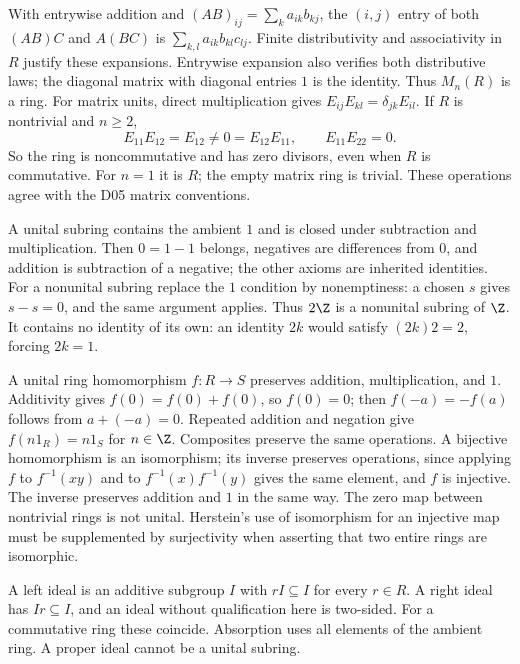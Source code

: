 With entrywise addition and $(AB)_{ij}=\sum_k a_{ik}b_{kj}$, the
$(i,j)$ entry of both $(AB)C$ and $A(BC)$ is
$\sum_{k,l}a_{ik}b_{kl}c_{lj}$. Finite distributivity and associativity
in $R$ justify these expansions. Entrywise expansion also verifies both
distributive laws; the diagonal matrix with diagonal entries $1$ is the
identity. Thus $M_n(R)$ is a ring.
For matrix units, direct multiplication gives
$E_{ij}E_{kl}=\delta_{jk}E_{il}$. If $R$ is nontrivial and $n\ge2$,
\[
 E_{11}E_{12}=E_{12}\ne0=E_{12}E_{11},\qquad E_{11}E_{22}=0.
\]
So the ring is noncommutative and has zero divisors, even when $R$ is
commutative. For $n=1$ it is $R$; the empty matrix ring is trivial.
These operations agree with the D05 matrix conventions.

A unital subring contains the ambient $1$ and is closed under subtraction
and multiplication. Then $0=1-1$ belongs, negatives are differences from
$0$, and addition is subtraction of a negative; the other axioms are
inherited identities. For a nonunital subring replace the $1$ condition
by nonemptiness: a chosen $s$ gives $s-s=0$, and the same argument applies.
Thus $2\Z$ is a nonunital subring of $\Z$. It contains no identity of its
own: an identity $2k$ would satisfy $(2k)2=2$, forcing $2k=1$.

A unital ring homomorphism $f:R\to S$ preserves addition, multiplication,
and $1$. Additivity gives $f(0)=f(0)+f(0)$, so $f(0)=0$;
then $f(-a)=-f(a)$ follows from $a+(-a)=0$. Repeated addition and
negation give $f(n1_R)=n1_S$ for $n\in\Z$.
Composites preserve the same operations. A bijective homomorphism is an
isomorphism; its inverse preserves operations, since applying $f$ to
$f^{-1}(xy)$ and to $f^{-1}(x)f^{-1}(y)$ gives the same element, and
$f$ is injective. The inverse preserves addition and $1$ in the same way.
The zero map between nontrivial rings is not unital. Herstein's use of
isomorphism for an injective map must be supplemented by surjectivity
when asserting that two entire rings are isomorphic.

A left ideal is an additive subgroup $I$ with $rI\subseteq I$ for every
$r\in R$. A right ideal has $Ir\subseteq I$, and an ideal without
qualification here is two-sided. For a commutative ring these coincide.
Absorption uses all elements of the ambient ring. A proper ideal cannot
be a unital subring.

